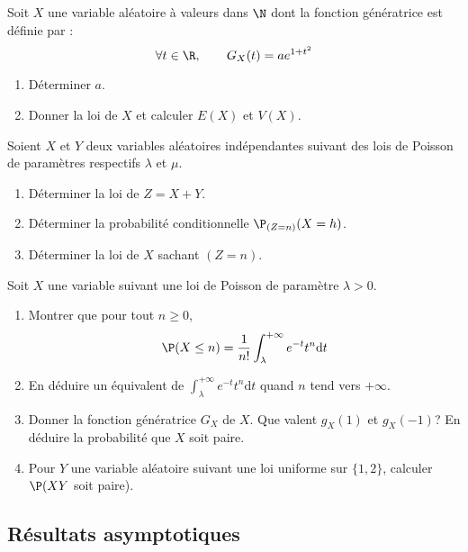 \documentclass[a4paper,twoside,french,11pt]{VcCours}
\newcommand{\dt}{\text{d}t}
\begin{document}
\begin{Exercice}{} Soit $X$ une variable aléatoire \`a valeurs dans $\N$ dont la fonction génératrice est définie par :
$$\forall t\in\R,\qquad G_X(t)=ae^{1+t^2}$$

\begin{enumerate}
	\item Déterminer $a.$
	
	\item Donner la loi de $X$ et calculer $E(X)$ et $V(X).$
	
\end{enumerate}
\end{Exercice}



\begin{Exercice}{}
Soient $X$ et $Y$ deux variables aléatoires indépendantes suivant des lois de Poisson de paramètres respectifs $\lambda$ et $\mu$.
\begin{enumerate}
\item Déterminer la loi de $Z=X+Y$.
\item Déterminer la probabilité conditionnelle $\P_{(Z=n)}(X=h)$.
\item Déterminer la loi de $X$ sachant $(Z=n)$.
\end{enumerate}
\end{Exercice}




\begin{Exercice}{}
Soit $X$ une variable suivant une loi de Poisson de paramètre $\lambda>0$. 
\begin{enumerate}
\item Montrer que pour tout $n \geq 0$,
$$ \P(X \leq n) = \dfrac{1}{n!} \int_{\lambda}^{+ \infty} e^{-t} t^n \dt$$
\item En déduire un équivalent de $\int_{\lambda}^{+ \infty} e^{-t} t^n \dt$ quand $n$ tend vers $+ \infty$.
\item Donner la fonction génératrice $G_X$ de $X$. Que valent $g_X(1)$ et $g_X(-1)$? En déduire la probabilité que $X$ soit paire.
\item Pour $Y$ une variable aléatoire suivant une loi uniforme sur $\lbrace 1,2 \rbrace$, calculer $\P(XY$ soit paire).
\end{enumerate}
\end{Exercice}


\newpage


\subsection{Résultats asymptotiques}
\end{document}

